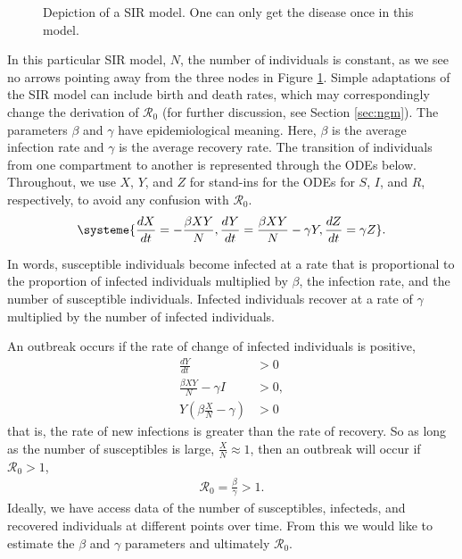 \documentclass[12pt]{article}
\newcommand{\rr}{\ensuremath{\mathcal{R}_0}}
\begin{document}
\begin{figure}[h]
\centering
{}
\caption{Depiction of a SIR model.  One can only get the disease once in this model.}\label{fig::sir}
\end{figure}
In this particular  SIR model, $N$, the number of individuals is constant, as we see no arrows pointing away from the three nodes in Figure \ref{fig::sir}. Simple adaptations of the SIR model can include birth and death rates, which may correspondingly change the derivation of $\rr$ (for further discussion, see Section \ref{sec:ngm}). The parameters  $\beta$ and $\gamma$ have epidemiological meaning.  Here, $\beta$ is the average infection rate and $\gamma$ is the average recovery rate.  The transition of individuals from one compartment to another is represented through the ODEs below.  Throughout, we use $X$, $Y$, and $Z$ for stand-ins for the ODEs for $S$, $I$, and $R$, respectively, to avoid any confusion with $\rr$.
\begin{align}
\systeme{\frac{dX}{dt} = -\frac{\beta XY}{N}, \frac{dY}{dt} = \frac{\beta XY}{N} - \gamma Y, \frac{dZ}{dt} = \gamma Z}. \label{eq::sir}
\end{align}

In words, susceptible individuals become infected at a rate that is proportional to the proportion of infected individuals multiplied by $\beta$, the infection rate, and the number of susceptible individuals.  Infected individuals recover at a rate of $\gamma$ multiplied by the number of infected individuals.

An outbreak occurs if the rate of change of infected individuals is positive,
\begin{align*}
  \frac{dY}{dt} &> 0 \\
  \frac{\beta X Y}{N}  - \gamma I &> 0 ,\\
  Y \left ( \beta \frac{X}{N} - \gamma \right ) & > 0
\end{align*}
that is,  the rate of new infections is greater than the rate of recovery.  So as long as the number of susceptibles is large, $\frac{X}{N} \approx 1$, then an outbreak will occur if $\rr >1$,
\begin{align}\label{eq:deriv_sir}
  \rr = \frac{\beta}{\gamma} > 1.
  \end{align}
Ideally, we have access data of the number of susceptibles, infecteds, and recovered individuals at different points over time.  From this we would like to estimate the $\beta$ and $\gamma$ parameters and ultimately $\rr$.
\end{document}
